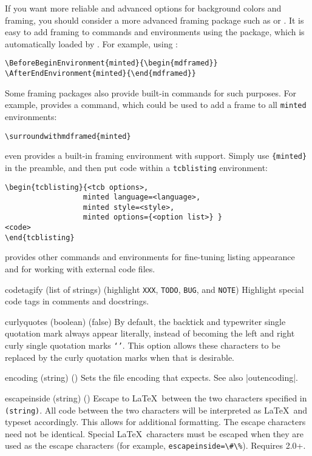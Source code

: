 \begin{optionlist}
If you want more reliable and advanced options for background colors and framing, you should consider a more advanced framing package such as  or .  It is easy to add framing to  commands and environments using the  package, which is automatically loaded by .  For example, using :
\begin{Verbatim}
\BeforeBeginEnvironment{minted}{\begin{mdframed}}
\AfterEndEnvironment{minted}{\end{mdframed}}
\end{Verbatim}
Some framing packages also provide built-in commands for such purposes.  For example,  provides a \texttt{\string\surroundwithmdframed} command, which could be used to add a frame to all \texttt{minted} environments:
\begin{Verbatim}
\surroundwithmdframed{minted}
\end{Verbatim}
 even provides a built-in framing environment with  support.  Simply use \texttt{\string\tcbuselibrary\{minted\}} in the preamble, and then put code within a \texttt{tcblisting} environment:
\begin{Verbatim}
\begin{tcblisting}{<tcb options>,
                  minted language=<language>,
                  minted style=<style>,
                  minted options={<option list>} }
<code>
\end{tcblisting}
\end{Verbatim}
 provides other commands and environments for fine-tuning listing appearance and for working with external code files.

  \item[codetagify (list of strings) (\textrm{highlight \texttt{XXX}, \texttt{TODO}, \texttt{BUG}, and \texttt{NOTE}})]
    Highlight special code tags in comments and docstrings.

\item[curlyquotes (boolean) (false)]
By default, the backtick \texttt{\textasciigrave} and typewriter single quotation mark \texttt{\textquotesingle} always appear literally, instead of becoming the left and right curly single quotation marks \texttt{`'}.  This option allows these characters to be replaced by the curly quotation marks when that is desirable.

  \item[encoding (string) (\meta{system-specific})]
    Sets the file encoding that  expects.  See also |outencoding|.
  \item[escapeinside (string) (\meta{none})]
  Escape to \LaTeX\ between the two characters specified in \texttt{\string(string\string)}.  All code between the two characters will be interpreted as \LaTeX\ and typeset accordingly.  This allows for additional formatting.  The escape characters need not be identical.  Special \LaTeX\ characters must be escaped when they are used as the escape characters (for example, \texttt{escapeinside=\textbackslash\#\textbackslash\%}).  Requires  2.0+.


\end{optionlist}
